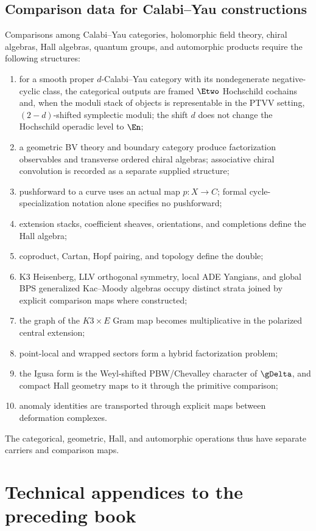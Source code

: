 \chapter{Comparison data for Calabi--Yau constructions}
Comparisons among Calabi--Yau categories, holomorphic field theory, chiral algebras, Hall algebras, quantum groups, and automorphic products require the following structures:
\begin{enumerate}
\item for a smooth proper $d$-Calabi--Yau category with its nondegenerate negative-cyclic class, the categorical outputs are framed $\Etwo$ Hochschild cochains and, when the moduli stack of objects is representable in the PTVV setting, $(2-d)$-shifted symplectic moduli; the shift $d$ does not change the Hochschild operadic level to $\En$;
\item a geometric BV theory and boundary category produce factorization observables and transverse ordered chiral algebras; associative chiral convolution is recorded as a separate supplied structure;
\item pushforward to a curve uses an actual map $p:X\to C$; formal cycle-specialization notation alone specifies no pushforward;
\item extension stacks, coefficient sheaves, orientations, and completions define the Hall algebra;
\item coproduct, Cartan, Hopf pairing, and topology define the double;
\item K3 Heisenberg, LLV orthogonal symmetry, local ADE Yangians, and global BPS generalized Kac--Moody algebras occupy distinct strata joined by explicit comparison maps where constructed;
\item the graph of the $K3\times E$ Gram map becomes multiplicative in the polarized central extension;
\item point-local and wrapped sectors form a hybrid factorization problem;
\item the Igusa form is the Weyl-shifted PBW/Chevalley character of $\gDelta$, and compact Hall geometry maps to it through the primitive comparison;
\item anomaly identities are transported through explicit maps between deformation complexes.
\end{enumerate}
The categorical, geometric, Hall, and automorphic operations thus have separate carriers and comparison maps.

\part{Technical appendices to the preceding book}
